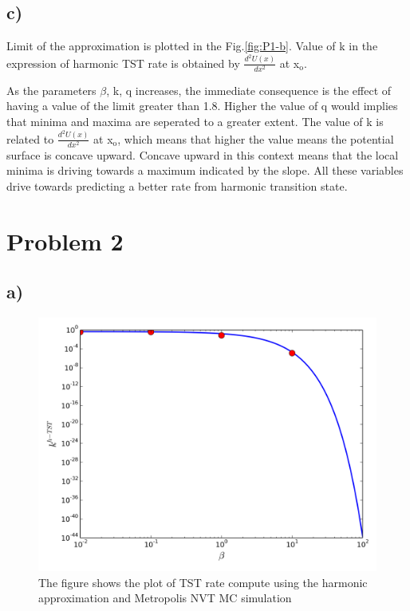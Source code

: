 \documentclass{article}
\begin{document}
\subsection{c)}
\label{sec-1-3}
Limit of the approximation is plotted in the Fig.\ref{fig:P1-b}. Value of k in the expression of harmonic TST rate is obtained by $\frac{d^2U(x)}{dx^2}$ at x$_{\text{o}}$. 

As the parameters $\beta$, k, q increases, the immediate consequence is the effect of having a value of the limit greater than 1.8. Higher the value of q would implies that minima and maxima are seperated to a greater extent. The value of k is related to $\frac{d^2U(x)}{dx^2}$ at x$_{\text{o}}$, which means that higher the value means the potential surface is concave upward. Concave upward in this context means that the local minima is driving towards a maximum indicated by the slope. All these variables drive towards predicting a better rate from harmonic transition state.

\section{Problem 2}
\label{sec-2}
\subsection{a)}
\label{sec-2-1}
\begin{figure}[htb]
\centering
\includegraphics[width=.9\linewidth]{./P2/P1-b.png}
\caption{\label{fig:P2}The figure shows the plot of TST rate compute using the harmonic approximation and Metropolis NVT MC simulation}
\end{figure}
\end{document}
